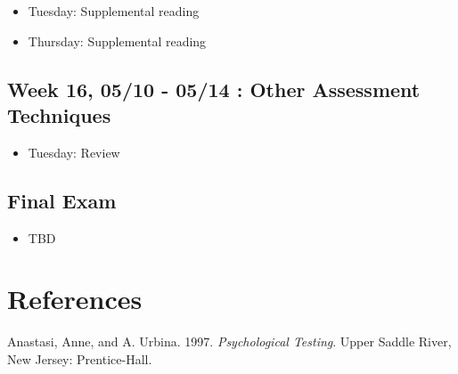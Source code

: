 \documentclass[11pt,]{article}
\providecommand{\tightlist}{%
  \setlength{\itemsep}{0pt}\setlength{\parskip}{0pt}}
\begin{document}
\begin{itemize}
\tightlist
\item
  Tuesday: Supplemental reading
\item
  Thursday: Supplemental reading
\end{itemize}

\hypertarget{week-16-0510---0514-other-assessment-techniques}{%
\subsection{Week 16, 05/10 - 05/14 : Other Assessment
Techniques}\label{week-16-0510---0514-other-assessment-techniques}}

\begin{itemize}
\tightlist
\item
  Tuesday: Review
\end{itemize}

\hypertarget{final-exam}{%
\subsection{Final Exam}\label{final-exam}}

\begin{itemize}
\tightlist
\item
  TBD
\end{itemize}

\hypertarget{references}{%
\section*{References}\label{references}}

\hypertarget{refs}{}
\begin{CSLReferences}{1}{0}
\leavevmode\hypertarget{ref-anastasi1997}{}%
Anastasi, Anne, and A. Urbina. 1997. \emph{Psychological Testing}. Upper
Saddle River, New Jersey: Prentice-Hall.

\end{CSLReferences}
\end{document}
